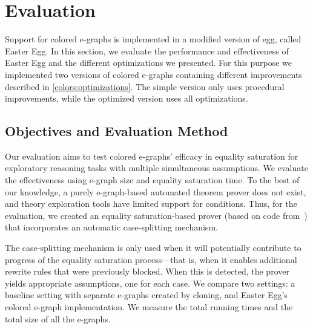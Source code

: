 \section{Evaluation}
\label{colors:eval}




Support for colored e-graphs is implemented in
a modified version of egg, called Easter Egg.
In this section, we evaluate the performance and effectiveness of Easter Egg and the different optimizations we presented.
For this purpose we implemented two versions of colored e-graphs containing different improvements described in \autoref{colors:optimizations}.
The simple version only uses procedural improvements, while the optimized version uses all optimizations.

\subsection{Objectives and Evaluation Method}
Our evaluation aims to test colored e-graphs' efficacy in equality saturation for exploratory reasoning tasks with multiple simultaneous assumptions. 
We evaluate the effectiveness using e-graph size and equality saturation time. 
To the best of our knowledge, a purely e-graph-based automated theorem prover does not exist, and theory exploration tools have limited support for conditions.
Thus, for the evaluation, we created an equality saturation-based prover (based on code from~\cite{thesy}) that incorporates an automatic case-splitting mechanism. 

The case-splitting mechanism is only used when it will potentially contribute to progress of the equality saturation process---that is, when it enables additional rewrite rules that were previously blocked.
When this is detected, the prover yields appropriate assumptions, one for each case.
We compare two settings:
a baseline setting with separate e-graphs
created by cloning, and Easter Egg's colored e-graph implementation.
We measure the total running times and the total size of all the e-graphs.

